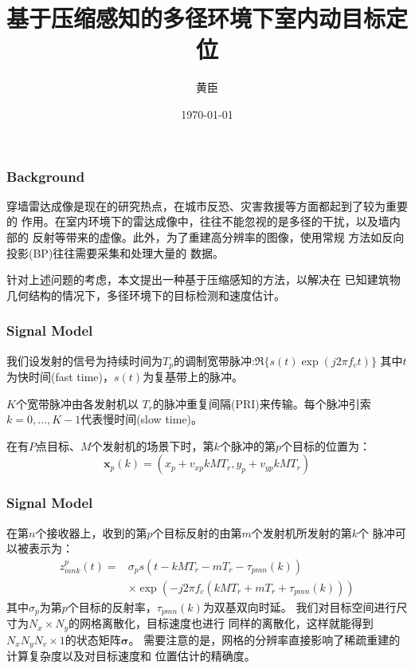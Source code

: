 \documentclass[cjk]{beamer}
\begin{document}
 
\title{基于压缩感知的多径环境下室内动目标定位}  
  \author{黄臣}  
  \date{\today}  
  \frame{\titlepage}  
  \begin{frame}
	\frametitle{Background}
	穿墙雷达成像是现在的研究热点，在城市反恐、灾害救援等方面都起到了较为重要的
	作用。在室内环境下的雷达成像中，往往不能忽视的是多径的干扰，以及墙内部的
	反射等带来的虚像。此外，为了重建高分辨率的图像，使用常规
	方法如反向投影(BP)往往需要采集和处理大量的
	数据。
	\par 针对上述问题的考虑，本文提出一种基于压缩感知的方法，以解决在
	已知建筑物
	几何结构的情况下，多径环境下的目标检测和速度估计。
  \end{frame}
  \begin{frame}
	\frametitle{Signal Model}
	我们设发射的信号为持续时间为$T_p$的调制宽带脉冲:$\Re\{s(t)\exp(j2\pi f_{c}t)\}$
	其中$t$为快时间(fast time)，$s(t)$为复基带上的脉冲。
	\par $K$个宽带脉冲由各发射机以
	$T_r$的脉冲重复间隔(PRI)来传输。每个脉冲引索$k=0,\ldots, K-1$代表慢时间(slow time)。
	\par 在有$P$点目标、$M$个发射机的场景下时，第$k$个脉冲的第$p$个目标的位置为：
	\begin{equation}
	 \boldsymbol x_{p}(k)=(x_{p}+v_{xp}kMT_{r}, y_{p}+v_{yp}kMT_{r})
	\end{equation}
  \end{frame}
  \begin{frame}
	\frametitle{Signal Model}
	在第$n$个接收器上，收到的第$p$个目标反射的由第$m$个发射机所发射的第$k$个
	脉冲可以被表示为：
	\begin{equation}
	  \begin{split}
	  z_{mnk}^{p}(t)=&\sigma_{p}s\left(t-kMT_{r}-mT_{r}-\tau_{pmn}(k)\right)\\
	  &\times\exp\left(-j2\pi f_{c}\left(kMT_{r}+mT_{r}+\tau_{pmn}(k)\right)\right)
	  \end{split}
	\end{equation}
	其中$\sigma_{p}$为第$p$个目标的反射率，$\tau_{pmn}(k)$为双基双向时延。
	我们对目标空间进行尺寸为$N_{x}\times N_{y}$的网格离散化，目标速度也进行
	同样的离散化，这样就能得到$N_{x}N_{y}N_{v}\times 1$的状态矩阵$\boldsymbol\sigma$。
	需要注意的是，网格的分辨率直接影响了稀疏重建的计算复杂度以及对目标速度和
	位置估计的精确度。
  \end{frame}
\end{document}
